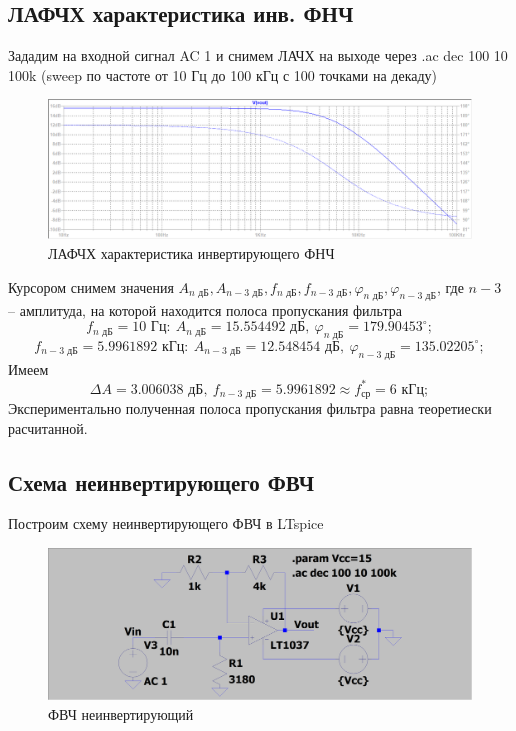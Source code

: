 \documentclass[a4paper, 12pt]{article}
\begin{document}
    \subsection{ЛАФЧХ характеристика инв. ФНЧ}
    Зададим на входной сигнал AC 1 и снимем ЛАЧХ на выходе через .ac dec 100 10 100k (sweep по частоте от 10 Гц до 100 кГц с 100 точками на декаду)
    \begin{figure}[H]
        \centering
        \includegraphics[scale=0.46]{1task_lapfr.png}
        \captionsetup{skip=0pt}
        \caption{ЛАФЧХ характеристика инвертирующего ФНЧ}
        \label{fig:1task_lapfr}
    \end{figure}
    \noindent Курсором снимем значения $A_{n\text{ дБ}},A_{n-3\text{ дБ}},f_{n\text{ дБ}}, f_{n-3\text{ дБ}},\varphi_{n\text{ дБ}}, \varphi_{n-3\text{ дБ}}$,
    где $n-3$ -- амплитуда, на которой находится полоса пропускания фильтра
    $$
    f_{n\text{ дБ}}=10\text{ Гц}:\ A_{n\text{ дБ}}=15.554492\text{ дБ},\ \varphi_{n\text{ дБ}}=179.90453^{\circ};
    $$
    $$
    f_{n-3\text{ дБ}}=5.9961892 \text{ кГц}:\ A_{n-3\text{ дБ}}=12.548454\text{ дБ},\ \varphi_{n-3\text{ дБ}}=135.02205^{\circ};
    $$
    Имеем
    $$
    \Delta A=3.006038\text{ дБ},\ f_{n-3\text{ дБ}}=5.9961892\approx f_\text{ср}^*=6\text{ кГц};
    $$
    Экспериментально полученная полоса пропускания фильтра равна теоретиески расчитанной.


    \subsection{Схема неинвертирующего ФВЧ}
    Построим схему неинвертирующего ФВЧ в LTspice
    \begin{figure}[H]
        \centering
        \includegraphics[scale=0.22]{scheme2.png}
        \captionsetup{skip=0pt}
        \caption{ФВЧ неинвертирующий}
        \label{fig:scheme2}
    \end{figure}
\end{document}
